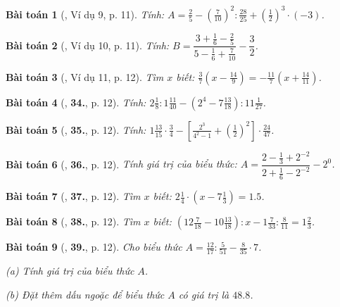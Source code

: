 \documentclass{article}
\numberwithin{equation}{section}
\newtheorem{baitoan}{Bài toán}[section]
\begin{document}
\begin{baitoan}[\cite{Tuyen_Toan_7}, Ví dụ 9, p. 11]
	Tính: $A = \frac{2}{5} - \left(\frac{7}{10}\right)^2:\frac{28}{25} + \left(\frac{1}{2}\right)^3\cdot(-3)$.
\end{baitoan}

\begin{baitoan}[\cite{Tuyen_Toan_7}, Ví dụ 10, p. 11]
	Tính: $B = \dfrac{3 + \frac{1}{6} - \frac{2}{5}}{5 - \frac{1}{6} + \frac{7}{10}} - \dfrac{3}{2}$.
\end{baitoan}

\begin{baitoan}[\cite{Tuyen_Toan_7}, Ví dụ 11, p. 12]
	Tìm $x$ biết: $\frac{3}{7}\left(x - \frac{14}{9}\right) = -\frac{11}{7}\left(x + \frac{14}{11}\right)$.
\end{baitoan}

\begin{baitoan}[\cite{Tuyen_Toan_7}, \textbf{34.}, p. 12]
	Tính: $2\frac{1}{8}:1\frac{11}{40} - \left(2^4 - 7\frac{13}{18}\right):11\frac{1}{27}$.
\end{baitoan}

\begin{baitoan}[\cite{Tuyen_Toan_7}, \textbf{35.}, p. 12]
	Tính: $1\frac{13}{15}\cdot\frac{3}{4} - \left[\frac{2^3}{4^2 - 1} + \left(\frac{1}{2}\right)^2\right]\cdot\frac{24}{47}$.
\end{baitoan}

\begin{baitoan}[\cite{Tuyen_Toan_7}, \textbf{36.}, p. 12]
	Tính giá trị của biểu thức: $A = \dfrac{2 - \frac{1}{3} + 2^{-2}}{2 + \frac{1}{6} - 2^{-2}} - 2^0$.
\end{baitoan}

\begin{baitoan}[\cite{Tuyen_Toan_7}, \textbf{37.}, p. 12]
	Tìm $x$ biết: $2\frac{1}{4}\cdot\left(x - 7\frac{1}{3}\right) = 1.5$.
\end{baitoan}

\begin{baitoan}[\cite{Tuyen_Toan_7}, \textbf{38.}, p. 12]
	Tìm $x$ biết: $\left(12\frac{7}{18} - 10\frac{13}{18}\right):x - 1\frac{7}{33}:\frac{8}{11} = 1\frac{2}{3}$.
\end{baitoan}

\begin{baitoan}[\cite{Tuyen_Toan_7}, \textbf{39.}, p. 12]
	Cho biểu thức $A = \frac{12}{17}:\frac{5}{51} - \frac{8}{35}\cdot 7$.
	\begin{enumerate*}
		\item[(a)] Tính giá trị của biểu thức $A$.
		\item[(b)] Đặt thêm dấu ngoặc để biểu thức $A$ có giá trị là $48.8$.
	\end{enumerate*}
\end{baitoan}
\end{document}

